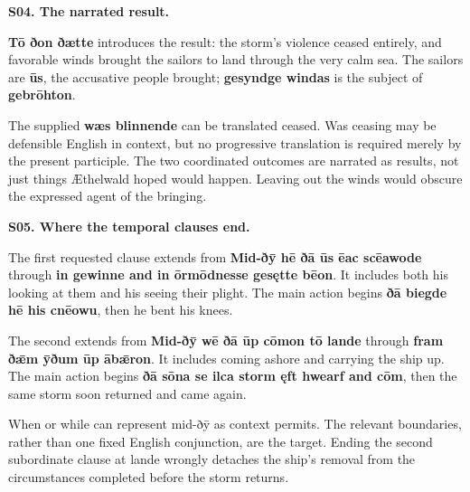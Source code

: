 \par\begin{minipage}{\linewidth}\raggedright
\textbf{S04. The narrated result.}

\textbf{Tō ðon ðætte} introduces the result: the storm's violence ceased entirely, and favorable winds brought the sailors to land through the very calm sea. The sailors are \textbf{ūs}, the accusative people brought; \textbf{gesyndge windas} is the subject of \textbf{gebrōhton}.

The supplied \textbf{wæs blinnende} can be translated ceased. Was ceasing may be defensible English in context, but no progressive translation is required merely by the present participle. The two coordinated outcomes are narrated as results, not just things Æthelwald hoped would happen. Leaving out the winds would obscure the expressed agent of the bringing.

\end{minipage}\par\addvspace{4pt}

\par\begin{minipage}{\linewidth}\raggedright
\textbf{S05. Where the temporal clauses end.}

The first requested clause extends from \textbf{Mid-ðȳ hē ðā ūs ēac scēawode} through \textbf{in gewinne and in ōrmōdnesse gesętte bēon}. It includes both his looking at them and his seeing their plight. The main action begins \textbf{ðā biegde hē his cnēowu}, then he bent his knees.

The second extends from \textbf{Mid-ðȳ wē ðā ūp cōmon tō lande} through \textbf{fram ðǣm ȳðum ūp ābǣron}. It includes coming ashore and carrying the ship up. The main action begins \textbf{ðā sōna se ilca storm ęft hwearf and cōm}, then the same storm soon returned and came again.

When or while can represent mid-ðȳ as context permits. The relevant boundaries, rather than one fixed English conjunction, are the target. Ending the second subordinate clause at lande wrongly detaches the ship's removal from the circumstances completed before the storm returns.

\end{minipage}\par\addvspace{4pt}

